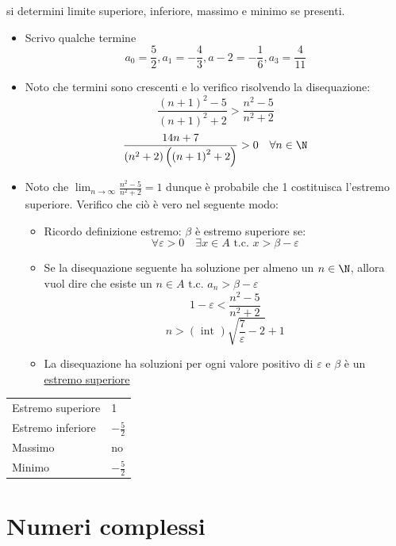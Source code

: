 si determini limite superiore, inferiore, massimo e minimo se presenti.
\begin{itemize}
	\item Scrivo qualche termine
	      \[
		      a_0 = \frac{5}{2}, a_1 = - \frac{4}{3} , a-2 = -\frac{1}{6}, a_3 =\frac{4}{11}
	      \]
	\item Noto che termini sono crescenti e lo verifico risolvendo la disequazione: \[
		      \frac{\left( n+1 \right) ^2 -5}{\left( n+1 \right) ^2 + 2} > \frac{n^2 -5 }{n^2 +2}
	      \]
	      \[
		      \frac{14n + 7}{\left( n^2 + 2 \right) \left( \left( n+1 \right) ^2 +2  \right) } > 0 \quad \forall n  \in  \N
	      \]
	\item Noto che $\lim_{n \to \infty} \frac{n^2 -5}{n^2 + 2} = 1 $ dunque è probabile che 1 costituisca l'estremo superiore. Verifico che ciò è vero nel seguente modo:
	      \begin{itemize}
		      \item Ricordo definizione estremo: $\beta$ è estremo superiore se:
		            \[
			            \forall \varepsilon > 0 \quad  \exists x  \in A \text{ t.c. } x > \beta - \varepsilon
		            \]
		      \item Se la disequazione seguente ha soluzione per almeno un $n  \in  \N$, allora vuol dire che esiste un $ n  \in  A \text{ t.c. } a_n > \beta - \varepsilon$
		            \[
			            1-\varepsilon < \frac{n^2 -5}{n^2 + 2}
		            \]
		            \[
			            n > \left( \text{ int } \right) \sqrt{\frac{7}{\varepsilon}-2} +1
		            \]
		      \item La disequazione ha soluzioni per ogni valore positivo di $\varepsilon$ e  $\beta $ è un \underline{estremo superiore}
	      \end{itemize}
\end{itemize}
\begin{table}[H]
	\centering
	\begin{tabular}{|ll|}
		\hline
		Estremo superiore & 1              \\
		Estremo inferiore & $-\frac{5}{2}$ \\
		Massimo           & no             \\
		Minimo            & $-\frac{5}{2}$ \\
		\hline
	\end{tabular}
\end{table}
\section{Numeri complessi}
